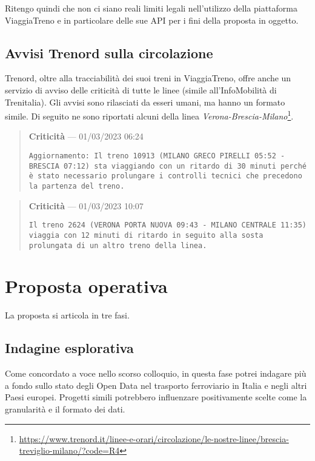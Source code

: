 \documentclass[italian,11pt,a4paper,final]{article}
\begin{document}
	Ritengo quindi che non ci siano reali limiti legali nell'utilizzo della piattaforma ViaggiaTreno e in particolare delle sue API per i fini della proposta in oggetto.
	
	\subsection{Avvisi Trenord sulla circolazione}
	
	Trenord, oltre alla tracciabilità dei suoi treni in ViaggiaTreno, offre anche un servizio di avviso delle criticità di tutte le linee (simile all'InfoMobilità di Trenitalia).
	Gli avvisi sono rilasciati da esseri umani, ma hanno un formato simile. Di seguito ne sono riportati alcuni della linea \textit{Verona-Brescia-Milano}\footnote{\url{https://www.trenord.it/linee-e-orari/circolazione/le-nostre-linee/brescia-treviglio-milano/?code=R4}}.
	
	\begin{quote}
		\textbf{Criticità} --- 01/03/2023 06:24
		
		\texttt{Aggiornamento:
		Il treno 10913 (MILANO GRECO PIRELLI 05:52 - BRESCIA 07:12) sta viaggiando con un ritardo di 30 minuti perché è stato necessario prolungare i controlli tecnici che precedono la partenza del treno.}
	\end{quote}
	
	\begin{quote}
		\textbf{Criticità} --- 01/03/2023 10:07\nopagebreak
		
		\texttt{Il treno 2624 (VERONA PORTA NUOVA 09:43 - MILANO CENTRALE 11:35) viaggia con 12 minuti di ritardo in seguito alla sosta prolungata di un altro treno della linea.}
	\end{quote}
	
	\section{Proposta operativa}
	La proposta si articola in tre fasi.
	
	\subsection{Indagine esplorativa}
	Come concordato a voce nello scorso colloquio, in questa fase potrei indagare più a fondo sullo stato degli Open Data nel trasporto ferroviario in Italia e negli altri Paesi europei.
	Progetti simili potrebbero influenzare positivamente scelte come la granularità e il formato dei dati.
	
\end{document}
